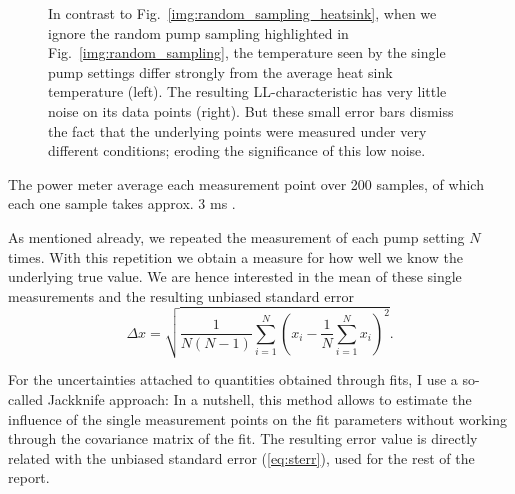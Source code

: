 \begin{figure}
\centering
{}
\caption{In contrast to Fig.~\ref{img:random_sampling_heatsink},
when we ignore the random pump sampling
highlighted in Fig.~\ref{img:random_sampling},
the temperature seen by the single pump settings
differ strongly from the average heat sink temperature
(left).
The resulting LL-characteristic
has very little noise on its data points
(right).
But these small error bars dismiss the fact
that the underlying points were measured
under very different conditions;
eroding the significance
of this low noise.}
\label{img:random_sampling_ramp_heatsink}
\end{figure}

The power meter average each measurement point
over 200 samples,
of which each one sample
takes approx. 3 ms \cite{ThorlabsPM}.

As mentioned already,
we repeated the measurement of each pump setting
$N$ times.
With this repetition we obtain a measure
for how well we know
the underlying true value.
We are hence interested in
the mean of these single measurements and
the resulting unbiased standard error \cite{Barlow}
\begin{equation}
\Delta x = \sqrt{ \frac{1}{N(N-1)}
	\sum\limits_{i=1}^N (x_i - 
		\frac{1}{N} \sum\limits_{i=1}^N x_i )^2 }.
\label{eq:sterr}
\end{equation}

For the uncertainties attached to
quantities obtained through fits,
I use a so-called
Jackknife \cite{Efron1983} approach:
In a nutshell,
this method allows to estimate
the influence of the single measurement points
on the fit parameters
without working through
the covariance matrix of the fit.
The resulting error value
is directly related with the
unbiased standard error (\ref{eq:sterr}),
used for the rest of the report.